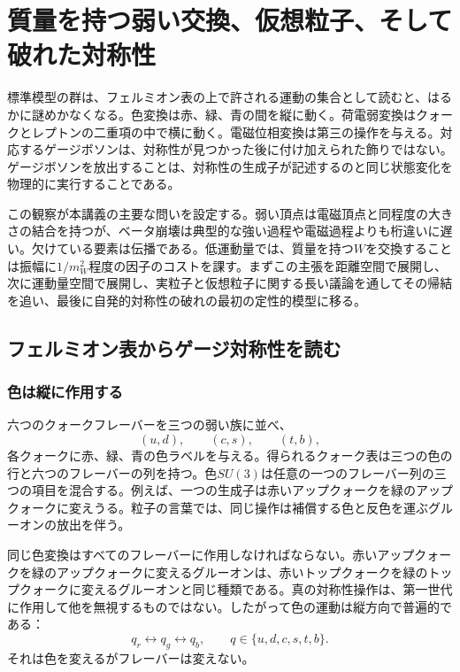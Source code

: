 \chapter{質量を持つ弱い交換、仮想粒子、そして破れた対称性}

標準模型の群は、フェルミオン表の上で許される運動の集合として読むと、はるかに謎めかなくなる。色変換は赤、緑、青の間を縦に動く。荷電弱変換はクォークとレプトンの二重項の中で横に動く。電磁位相変換は第三の操作を与える。対応するゲージボソンは、対称性が見つかった後に付け加えられた飾りではない。ゲージボソンを放出することは、対称性の生成子が記述するのと同じ状態変化を物理的に実行することである。

この観察が本講義の主要な問いを設定する。弱い頂点は電磁頂点と同程度の大きさの結合を持つが、ベータ崩壊は典型的な強い過程や電磁過程よりも桁違いに遅い。欠けている要素は伝播である。低運動量では、質量を持つ\(W\)を交換することは振幅に\(1/m_W^2\)程度の因子のコストを課す。まずこの主張を距離空間で展開し、次に運動量空間で展開し、実粒子と仮想粒子に関する長い議論を通してその帰結を追い、最後に自発的対称性の破れの最初の定性的模型に移る。

\section{フェルミオン表からゲージ対称性を読む}

\subsection{色は縦に作用する}

六つのクォークフレーバーを三つの弱い族に並べ、
\begin{equation}
  (u,d),\qquad(c,s),\qquad(t,b),
\end{equation}
各クォークに赤、緑、青の色ラベルを与える。得られるクォーク表は三つの色の行と六つのフレーバーの列を持つ。色\(SU(3)\)は任意の一つのフレーバー列の三つの項目を混合する。例えば、一つの生成子は赤いアップクォークを緑のアップクォークに変えうる。粒子の言葉では、同じ操作は補償する色と反色を運ぶグルーオンの放出を伴う。

同じ色変換はすべてのフレーバーに作用しなければならない。赤いアップクォークを緑のアップクォークに変えるグルーオンは、赤いトップクォークを緑のトップクォークに変えるグルーオンと同じ種類である。真の対称性操作は、第一世代に作用して他を無視するものではない。したがって色の運動は縦方向で普遍的である：
\begin{equation}
  q_r\longleftrightarrow q_g\longleftrightarrow q_b,
  \qquad q\in\{u,d,c,s,t,b\}.
\end{equation}
それは色を変えるがフレーバーは変えない。

